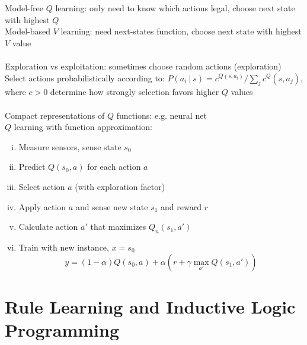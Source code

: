 \documentclass{article}
\begin{document}
			Model-free $Q$ learning: only need to know which actions legal, choose next state with highest $Q$ \\
			Model-based $V$ learning: need next-states function, choose next state with highest $V$ value \\
			\\
			Exploration vs exploitation: sometimes choose random actions (exploration) \\
			Select actions probabilistically according to: $P(a_i\:|\:s) = c^{Q(s, a_i)}/\sum_jc^Q(s, a_j)$, where $c > 0$ determine how strongly selection favors higher $Q$ values \\
			\\
			Compact representations of $Q$ functions: e.g. neural net \\
			$Q$ learning with function approximation:
			\begin{enumerate}[(i)]
				\item Measure sensors, sense state $s_0$
				\item Predict $Q(s_0, a)$ for each action $a$
				\item Select action $a$ (with exploration factor)
				\item Apply action $a$ and sense new state $s_1$ and reward $r$
				\item Calculate action $a'$ that maximizes $Q_n(s_1, a')$
				\item Train with new instance, $x = s_0$ 
				\begin{equation*}
					y = (1 - \alpha)Q(s_0, a) + \alpha\left(r + \gamma\max\limits_{a'}Q(s_1, a')\right)
					\end{equation*}
				
				\end{enumerate}
		\clearpage
	
	\section{Rule Learning and Inductive Logic Programming}
\end{document}
